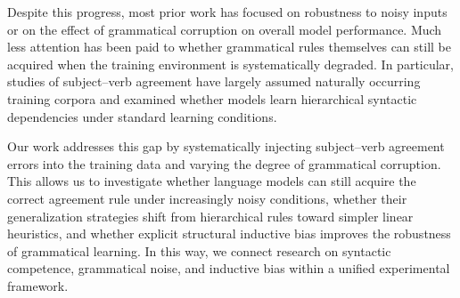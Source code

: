 Despite this progress, most prior work has focused on robustness to noisy inputs or on the effect of grammatical corruption on overall model performance. Much less attention has been paid to whether grammatical rules themselves can still be acquired when the training environment is systematically degraded. In particular, studies of subject--verb agreement have largely assumed naturally occurring training corpora and examined whether models learn hierarchical syntactic dependencies under standard learning conditions.

Our work addresses this gap by systematically injecting subject--verb agreement errors into the training data and varying the degree of grammatical corruption. This allows us to investigate whether language models can still acquire the correct agreement rule under increasingly noisy conditions, whether their generalization strategies shift from hierarchical rules toward simpler linear heuristics, and whether explicit structural inductive bias improves the robustness of grammatical learning. In this way, we connect research on syntactic competence, grammatical noise, and inductive bias within a unified experimental framework.

